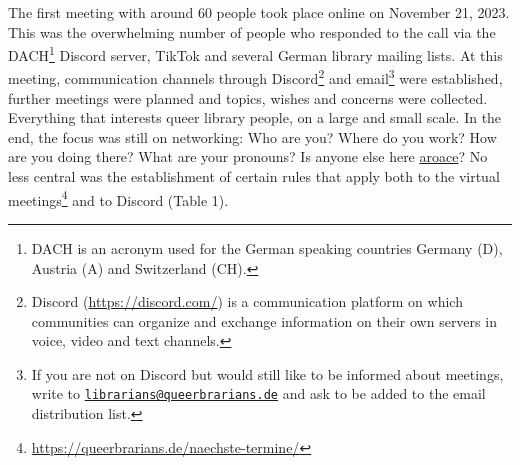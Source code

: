 \documentclass[a4paper,
fontsize=11pt,
oneside,
numbers=noperiodatend,
parskip=half-,
bibliography=totoc,
final
]{scrartcl}
\begin{document}
The first meeting with around 60 people took place online on November
21, 2023. This was the overwhelming number of people who responded to
the call via the DACH\footnote{DACH is an acronym used for the German
  speaking countries Germany (D), Austria (A) and Switzerland (CH).}
Discord server, TikTok and several German library mailing lists. At this
meeting, communication channels through Discord\footnote{Discord
  (\url{https://discord.com/}) is a communication platform on which
  communities can organize and exchange information on their own servers
  in voice, video and text channels.} and email\footnote{If you are not
  on Discord but would still like to be informed about meetings, write
  to
  \href{mailto:librarians@queerbrarians.de}{\nolinkurl{librarians@queerbrarians.de}}
  and ask to be added to the email distribution list.} were established,
further meetings were planned and topics, wishes and concerns were
collected. Everything that interests queer library people, on a large
and small scale. In the end, the focus was still on networking: Who are
you? Where do you work? How are you doing there? What are your pronouns?
Is anyone else here
\href{https://lgbtqia.mywikis.wiki/wiki/Aroace}{aroace}? No less central
was the establishment of certain rules that apply both to the virtual
meetings\footnote{\url{https://queerbrarians.de/naechste-termine/}} and
to Discord (Table 1).
\end{document}
